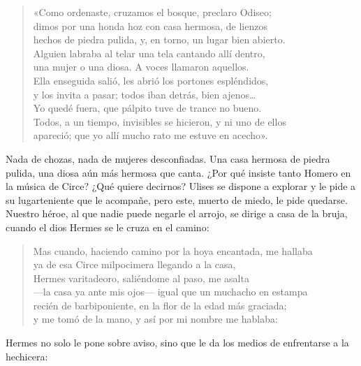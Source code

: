 \documentclass[11pt,a4paper]{article}
\begin{document}
\begin{verse}
«Como ordenaste, cruzamos el bosque, preclaro Odiseo;\\
dimos por una honda hoz con casa hermosa, de lienzos\\
hechos de piedra pulida, y, en torno, un lugar bien abierto.\\
Alguien labraba al telar una tela cantando allí dentro,\\
una mujer o una diosa. A voces llamaron aquellos.\\
Ella enseguida salió, les abrió los portones espléndidos,\\
y los invita a pasar; todos iban detrás, bien ajenos…\\
Yo quedé fuera, que pálpito tuve de trance no bueno.\\
Todos, a un tiempo, invisibles se hicieron, y ni uno de ellos\\
apareció; que yo allí mucho rato me estuve en acecho».
\end{verse}

Nada de chozas, nada de mujeres desconfiadas. Una casa hermosa de piedra pulida, una diosa aún más hermosa que canta. ¿Por qué insiste tanto Homero en la música de Circe? ¿Qué quiere decirnos? Ulises se dispone a explorar y le pide a su lugarteniente que le acompañe, pero este, muerto de miedo, le pide quedarse. Nuestro héroe, al que nadie puede negarle el arrojo, se dirige a casa de la bruja, cuando el dios Hermes se le cruza en el camino:

\begin{verse}
Mas cuando, haciendo camino por la hoya encantada, me hallaba\\
ya de esa Circe milpocimera llegando a la casa,\\
Hermes varitadeoro, saliéndome al paso, me asalta\\
---la casa ya ante mis ojos--- igual que un muchacho en estampa\\
recién de barbiponiente, en la flor de la edad más graciada;\\
y me tomó de la mano, y así por mi nombre me hablaba:
\end{verse}

Hermes no solo le pone sobre aviso, sino que le da los medios de enfrentarse a la hechicera:
\end{document}
